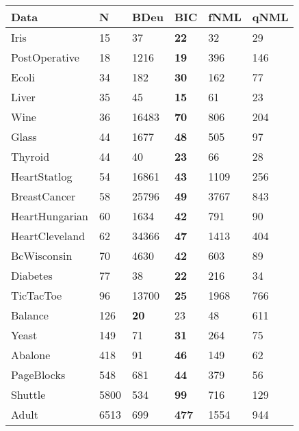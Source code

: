 \begin{tabular}{llllll}
\toprule
           Data &     N &         BDeu &           BIC &  fNML & qNML \\
\midrule
           Iris &    15 &           37 &   \textbf{22} &    32 &   29 \\
  PostOperative &    18 &         1216 &   \textbf{19} &   396 &  146 \\
          Ecoli &    34 &          182 &   \textbf{30} &   162 &   77 \\
          Liver &    35 &           45 &   \textbf{15} &    61 &   23 \\
           Wine &    36 &        16483 &   \textbf{70} &   806 &  204 \\
          Glass &    44 &         1677 &   \textbf{48} &   505 &   97 \\
        Thyroid &    44 &           40 &   \textbf{23} &    66 &   28 \\
   HeartStatlog &    54 &        16861 &   \textbf{43} &  1109 &  256 \\
   BreastCancer &    58 &        25796 &   \textbf{49} &  3767 &  843 \\
 HeartHungarian &    60 &         1634 &   \textbf{42} &   791 &   90 \\
 HeartCleveland &    62 &        34366 &   \textbf{47} &  1413 &  404 \\
    BcWisconsin &    70 &         4630 &   \textbf{42} &   603 &   89 \\
       Diabetes &    77 &           38 &   \textbf{22} &   216 &   34 \\
      TicTacToe &    96 &        13700 &   \textbf{25} &  1968 &  766 \\
        Balance &   126 &  \textbf{20} &            23 &    48 &  611 \\
          Yeast &   149 &           71 &   \textbf{31} &   264 &   75 \\
        Abalone &   418 &           91 &   \textbf{46} &   149 &   62 \\
     PageBlocks &   548 &          681 &   \textbf{44} &   379 &   56 \\
        Shuttle &  5800 &          534 &   \textbf{99} &   716 &  129 \\
          Adult &  6513 &          699 &  \textbf{477} &  1554 &  944 \\
\bottomrule
\end{tabular}
